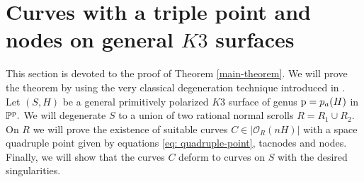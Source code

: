 \documentclass[plain]{amsart}
\def\p{\rm{p}}
\begin{document}
\section{Curves with a triple point and nodes on general $K3$ surfaces}
This section is devoted to the proof of Theorem \ref{main-theorem}.
We will prove the theorem by using the very classical  degeneration technique introduced
in \cite{clm}. Let $(S,H)$ be a general primitively polarized $K3$ surface of genus 
${\p}=p_a(H)$ in $\mathbb P^{\p}.$
We will degenerate $S$ to a union of two rational normal scrolls $R=R_1\cup R_2.$
On $R$ we will prove the existence of suitable curves $C\in |\mathcal O_{R}(nH)|$
with a space quadruple point given by equations \eqref{eq: quadruple-point}, tacnodes and nodes. Finally, we will
show that the curves $C$ deform to curves on $S$ with the desired singularities.
\end{document}
